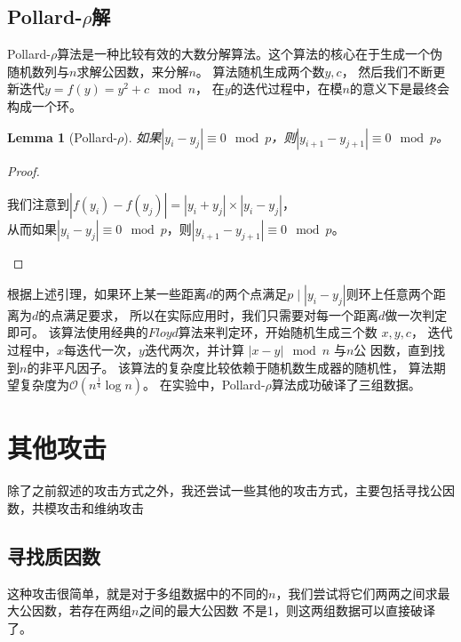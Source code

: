 \documentclass{ctexart}
\newtheorem{lemma}[theorem]{Lemma}
\begin{document}
\subsection{Pollard-\texorpdfstring{$\rho$}分解}
Pollard-$\rho$算法是一种比较有效的大数分解算法。这个算法的核心在于生成一个伪随机数列与$n$求解公因数，来分解$n$。
算法随机生成两个数$y,c$，
然后我们不断更新迭代$y=f(y)=y^2+c\mod n$，
在$y$的迭代过程中，在模$n$的意义下是最终会构成一个环。
\begin{lemma}[Pollard-$\rho$]
    如果$|y_i-y_j|\equiv 0\mod p$，则$|y_{i+1}-y_{j+1}|\equiv 0 \mod p$。
\end{lemma}
\begin{proof}
    \ \ \ \newline
    \begin{center}
        我们注意到$|f(y_i)-f(y_j)|=|y_i+y_j|\times|y_i-y_j|$，\\
    从而如果$|y_i-y_j|\equiv 0\mod p$，则$|y_{i+1}-y_{j+1}|\equiv 0 \mod p$。
    \end{center}
\end{proof}

根据上述引理，如果环上某一些距离$d$的两个点满足$p\mid  |y_i-y_j|$则环上任意两个距离为$d$的点满足要求，
所以在实际应用时，我们只需要对每一个距离$d$做一次判定即可。
该算法使用经典的$Floyd$算法来判定环，开始随机生成三个数 $x,y,c$，
迭代过程中，$x$每迭代一次，$y$迭代两次，并计算 $|x-y| \mod n$ 与$n$公
因数，直到找到$n$的非平凡因子。
该算法的复杂度比较依赖于随机数生成器的随机性，
算法期望复杂度为$\mathcal{O}(n^{\frac{1}{4}}\log n)$。
在实验中，Pollard-$\rho$算法成功破译了三组数据。

\section{其他攻击}
除了之前叙述的攻击方式之外，我还尝试一些其他的攻击方式，主要包括寻找公因数，共模攻击和维纳攻击
\subsection{寻找质因数}
这种攻击很简单，就是对于多组数据中的不同的$n$，我们尝试将它们两两之间求最大公因数，若存在两组$n$之间的最大公因数
不是1，则这两组数据可以直接破译了。
\end{document}
